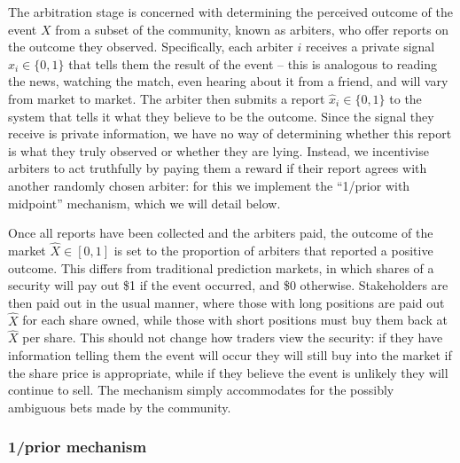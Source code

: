 The arbitration stage is concerned with determining the perceived outcome of
the event $X$ from a subset of the community, known as arbiters, who offer
reports on the outcome they observed. Specifically, each arbiter $i$ receives a
private signal $x_i \in \{0,1\}$ that tells them the result of the event --
this is analogous to reading the news, watching the match, even hearing about
it from a friend, and will vary from market to market. The arbiter then submits
a report $\hat{x}_i \in \{0,1\}$ to the system that tells it what they believe
to be the outcome. Since the signal they receive is private information, we
have no way of determining whether this report is what they truly observed or
whether they are lying. Instead, we incentivise arbiters to act truthfully by
paying them a reward if their report agrees with another randomly chosen
arbiter: for this we implement the ``1/prior with midpoint'' mechanism, which
we will detail below.

Once all reports have been collected and the arbiters paid, the outcome of the
market $\hat{X} \in [0,1]$ is set to the proportion of arbiters that reported a
positive outcome. This differs from traditional prediction markets, in which
shares of a security will pay out \$1 if the event occurred, and \$0 otherwise.
Stakeholders are then paid out in the usual manner, where those with long
positions are paid out $\hat{X}$ for each share owned, while those with short
positions must buy them back at $\hat{X}$ per share. This should not change how
traders view the security: if they have information telling them the event will
occur they will still buy into the market if the share price is appropriate,
while if they believe the event is unlikely they will continue to sell. The
mechanism simply accommodates for the possibly ambiguous bets made by the
community.

\subsubsection{1/prior mechanism}


